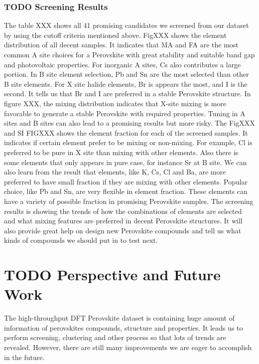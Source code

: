 \documentclass[twoside, twocolumn, 9pt, draft]{article}
\begin{document}
\subsubsection*{{\bfseries\sffamily TODO} Screening Results}
\label{sec:org81f2ee0}
The table XXX shows all 41 promising candidates we screened from our
dataset by using the cutoff criteria mentioned above. FigXXX shows the
element distribution of all decent samples. It indicates that MA and
FA are the most common A site choices for a Perovskite with great
stability and suitable band gap and photovoltaic properties. For
inorganic A sites, Cs also contributes a large portion. In B site
element selection, Pb and Sn are the most selected than other B site
elements. For X site halide elements, Br is appears the most, and I is
the second. It tells us that Br and I are preferred in a stable
Perovskite structure. In figure XXX, the mixing distribution indicates
that X-site mixing is more favorable to generate a stable Perovskite
with required properties. Tuning in A sites and B sites can also lead
to a promising results but more risky.  The FigXXX and SI FIGXXX shows
the element fraction for each of the screened samples. It indicates if
certain element prefer to be mixing or non-mixing. For example, Cl is
preferred to be pure in X site than mixing with other elements. Also
there is some elements that only appears in pure case, for instance Sr
at B site. We can also learn from the result that elements, like K,
Cs, Cl and Ba, are more preferred to have small fraction if they are
mixing with other elements. Popular choice, like Pb and Sn, are very
flexible in element fraction. These elements can have a variety of
possible fraction in promising Perovskite samples.  The screening
results is showing the trends of how the combinations of elements are
selected and what mixing features are preferred in decent Perovskite
structures. It will also provide great help on design new Perovskite
compounds and tell us what kinds of compounds we should put in to test
next.

\section*{{\bfseries\sffamily TODO} Perspective and Future Work}
\label{sec:orgb888ae4}
The high-throughput DFT Perovskite dataset is containing huge amount of
information of perovskites compounds, structure and properties. It
leads us to perform screening, clustering and other process so that
lots of trends are revealed. However, there are still many
improvements we are eager to accomplish in the future.
\end{document}

